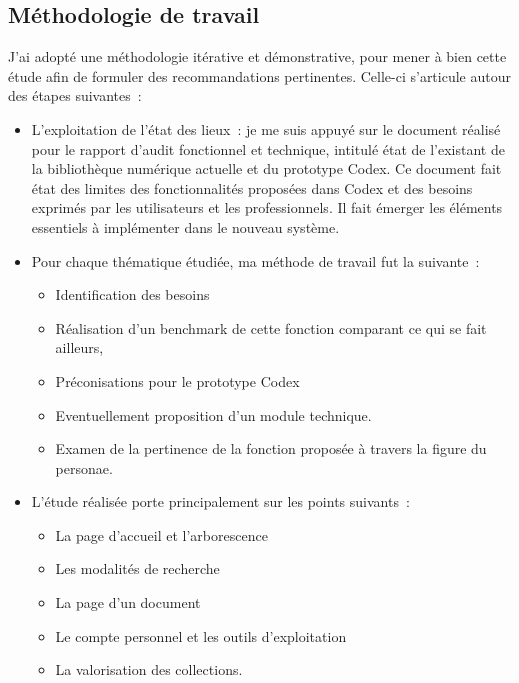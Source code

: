 \subsection{Méthodologie de travail}
J’ai adopté une méthodologie itérative et démonstrative, pour mener à bien cette étude afin de formuler des recommandations pertinentes. Celle-ci s’articule autour des étapes suivantes :
\begin{itemize}
	\item L’exploitation de l’état des lieux : je me suis appuyé sur le document réalisé pour le rapport d’audit fonctionnel et technique, intitulé état de l’existant de la bibliothèque numérique actuelle et du prototype Codex. Ce document fait état des limites des fonctionnalités proposées dans Codex et des besoins exprimés par les utilisateurs et les professionnels. Il fait émerger les éléments essentiels à implémenter dans le nouveau système. 
\item Pour chaque thématique étudiée, ma méthode de travail fut la suivante : 
\begin{itemize}
	\item Identification des besoins
\item Réalisation d’un benchmark de cette fonction comparant ce qui se fait ailleurs, 
\item Préconisations pour le prototype Codex
\item Eventuellement proposition d’un module technique. 
\item Examen de la pertinence de la fonction proposée à travers la figure du personae. 
\end{itemize}
\item L’étude réalisée porte principalement sur les points suivants :
\begin{itemize}
	\item La page d’accueil et l’arborescence
\item Les modalités de recherche
\item La page d’un document 
\item Le compte personnel et les outils d’exploitation
\item La valorisation des collections.
\end{itemize}
\end{itemize}
 
